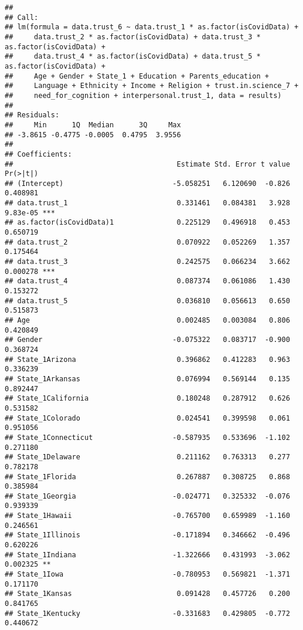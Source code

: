 \documentclass[
]{article}
\begin{document}
\begin{verbatim}
## 
## Call:
## lm(formula = data.trust_6 ~ data.trust_1 * as.factor(isCovidData) + 
##     data.trust_2 * as.factor(isCovidData) + data.trust_3 * as.factor(isCovidData) + 
##     data.trust_4 * as.factor(isCovidData) + data.trust_5 * as.factor(isCovidData) + 
##     Age + Gender + State_1 + Education + Parents_education + 
##     Language + Ethnicity + Income + Religion + trust.in.science_7 + 
##     need_for_cognition + interpersonal.trust_1, data = results)
## 
## Residuals:
##     Min      1Q  Median      3Q     Max 
## -3.8615 -0.4775 -0.0005  0.4795  3.9556 
## 
## Coefficients:
##                                       Estimate Std. Error t value Pr(>|t|)    
## (Intercept)                          -5.058251   6.120690  -0.826 0.408981    
## data.trust_1                          0.331461   0.084381   3.928 9.83e-05 ***
## as.factor(isCovidData)1               0.225129   0.496918   0.453 0.650719    
## data.trust_2                          0.070922   0.052269   1.357 0.175464    
## data.trust_3                          0.242575   0.066234   3.662 0.000278 ***
## data.trust_4                          0.087374   0.061086   1.430 0.153272    
## data.trust_5                          0.036810   0.056613   0.650 0.515873    
## Age                                   0.002485   0.003084   0.806 0.420849    
## Gender                               -0.075322   0.083717  -0.900 0.368724    
## State_1Arizona                        0.396862   0.412283   0.963 0.336239    
## State_1Arkansas                       0.076994   0.569144   0.135 0.892447    
## State_1California                     0.180248   0.287912   0.626 0.531582    
## State_1Colorado                       0.024541   0.399598   0.061 0.951056    
## State_1Connecticut                   -0.587935   0.533696  -1.102 0.271180    
## State_1Delaware                       0.211162   0.763313   0.277 0.782178    
## State_1Florida                        0.267887   0.308725   0.868 0.385984    
## State_1Georgia                       -0.024771   0.325332  -0.076 0.939339    
## State_1Hawaii                        -0.765700   0.659989  -1.160 0.246561    
## State_1Illinois                      -0.171894   0.346662  -0.496 0.620226    
## State_1Indiana                       -1.322666   0.431993  -3.062 0.002325 ** 
## State_1Iowa                          -0.780953   0.569821  -1.371 0.171170    
## State_1Kansas                         0.091428   0.457726   0.200 0.841765    
## State_1Kentucky                      -0.331683   0.429805  -0.772 0.440672    

\end{verbatim}
\end{document}
